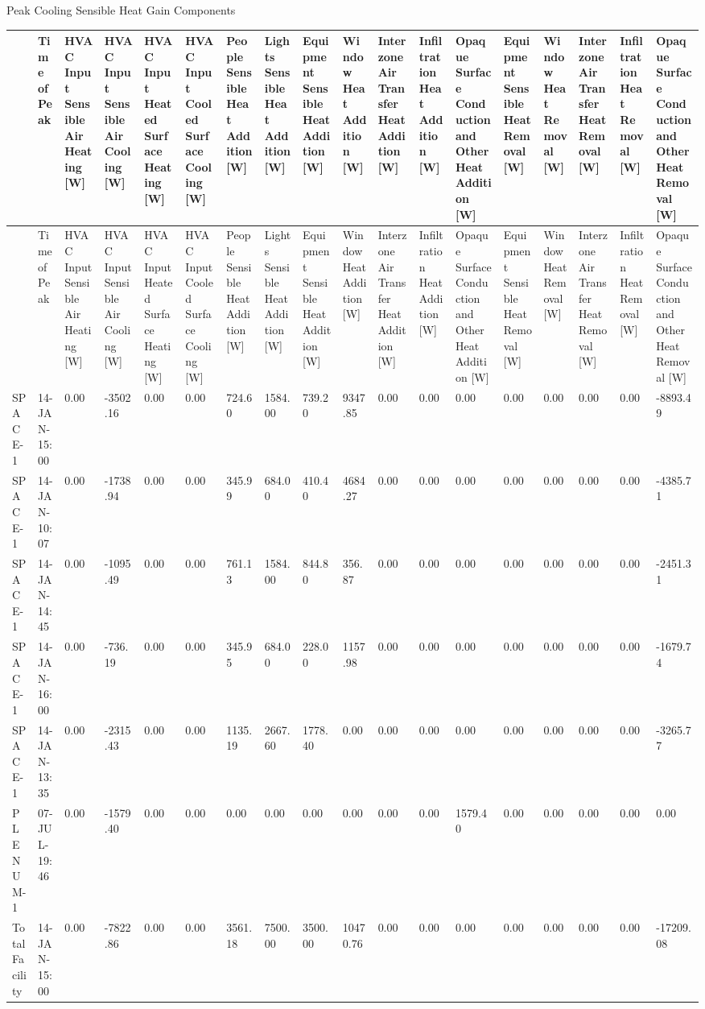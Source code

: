 Peak Cooling Sensible Heat Gain Components

{\tiny
\begin{longtable}[c]{>{\raggedright}p{0.28in}>{\raggedright}p{0.28in}>{\raggedright}p{0.28in}>{\raggedright}p{0.28in}>{\raggedright}p{0.28in}>{\raggedright}p{0.28in}>{\raggedright}p{0.28in}>{\raggedright}p{0.28in}>{\raggedright}p{0.28in}>{\raggedright}p{0.28in}>{\raggedright}p{0.28in}>{\raggedright}p{0.28in}>{\raggedright}p{0.28in}>{\raggedright}p{0.28in}>{\raggedright}p{0.28in}>{\raggedright}p{0.28in}>{\raggedright}p{0.28in}>{\raggedright}p{0.28in}}
\toprule 
 & Time of Peak & HVAC Input Sensible Air Heating [W] & HVAC Input Sensible Air Cooling [W] & HVAC Input Heated Surface Heating [W] & HVAC Input Cooled Surface Cooling [W] & People Sensible Heat Addition [W] & Lights Sensible Heat Addition [W] & Equipment Sensible Heat Addition [W] & Window Heat Addition [W] & Interzone Air Transfer Heat Addition [W] & Infiltration Heat Addition [W] & Opaque Surface Conduction and Other Heat Addition [W] & Equipment Sensible Heat Removal [W] & Window Heat Removal [W] & Interzone Air Transfer Heat Removal [W] & Infiltration Heat Removal [W] & Opaque Surface Conduction and Other Heat Removal [W] \tabularnewline
\midrule
\endfirsthead

\toprule 
 & Time of Peak & HVAC Input Sensible Air Heating [W] & HVAC Input Sensible Air Cooling [W] & HVAC Input Heated Surface Heating [W] & HVAC Input Cooled Surface Cooling [W] & People Sensible Heat Addition [W] & Lights Sensible Heat Addition [W] & Equipment Sensible Heat Addition [W] & Window Heat Addition [W] & Interzone Air Transfer Heat Addition [W] & Infiltration Heat Addition [W] & Opaque Surface Conduction and Other Heat Addition [W] & Equipment Sensible Heat Removal [W] & Window Heat Removal [W] & Interzone Air Transfer Heat Removal [W] & Infiltration Heat Removal [W] & Opaque Surface Conduction and Other Heat Removal [W] \tabularnewline
\midrule
\endhead

SPACE\-1-1 & 14-JAN-15:00 & 0.00 & -3502.16 & 0.00 & 0.00 & 724.60 & 1584.00 & 739.20 & 9347.85 & 0.00 & 0.00 & 0.00 & 0.00 & 0.00 & 0.00 & 0.00 & -8893.49 \tabularnewline
SPACE\-2-1 & 14-JAN-10:07 & 0.00 & -1738.94 & 0.00 & 0.00 & 345.99 & 684.00 & 410.40 & 4684.27 & 0.00 & 0.00 & 0.00 & 0.00 & 0.00 & 0.00 & 0.00 & -4385.71 \tabularnewline
SPACE\-3-1 & 14-JAN-14:45 & 0.00 & -1095.49 & 0.00 & 0.00 & 761.13 & 1584.00 & 844.80 & 356.87 & 0.00 & 0.00 & 0.00 & 0.00 & 0.00 & 0.00 & 0.00 & -2451.31 \tabularnewline
SPACE\-4-1 & 14-JAN-16:00 & 0.00 & -736.19 & 0.00 & 0.00 & 345.95 & 684.00 & 228.00 & 1157.98 & 0.00 & 0.00 & 0.00 & 0.00 & 0.00 & 0.00 & 0.00 & -1679.74 \tabularnewline
SPACE\-5-1 & 14-JAN-13:35 & 0.00 & -2315.43 & 0.00 & 0.00 & 1135.19 & 2667.60 & 1778.40 & 0.00 & 0.00 & 0.00 & 0.00 & 0.00 & 0.00 & 0.00 & 0.00 & -3265.77 \tabularnewline
PLE\-NUM-1 & 07-JUL-19:46 & 0.00 & -1579.40 & 0.00 & 0.00 & 0.00 & 0.00 & 0.00 & 0.00 & 0.00 & 0.00 & 1579.40 & 0.00 & 0.00 & 0.00 & 0.00 & 0.00 \tabularnewline
Total Facility & 14-JAN-15:00 & 0.00 & -7822.86 & 0.00 & 0.00 & 3561.18 & 7500.00 & 3500.00 & 10470.76 & 0.00 & 0.00 & 0.00 & 0.00 & 0.00 & 0.00 & 0.00 & -17209.08 \tabularnewline
\bottomrule
\end{longtable}}

